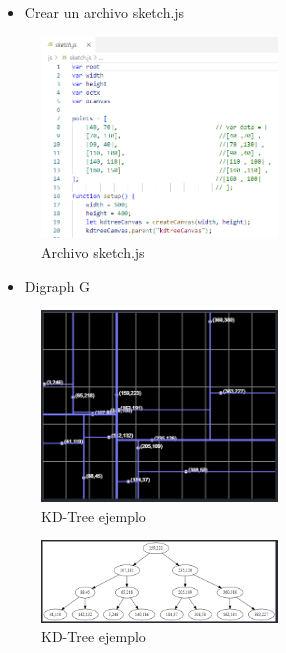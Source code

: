 \documentclass{article}
\begin{document}
\begin{enumerate}
\begin{itemize}
   \item Crear un archivo sketch.js
\end{itemize}

\begin{figure}[H]
\centering
\includegraphics[width=0.56\textwidth]{Img/sketch.js.png}
\caption{Archivo sketch.js}
\end{figure}

\begin{itemize}
   \item Digraph G
\end{itemize}

\begin{figure}[H]
\centering
\includegraphics[width=0.56\textwidth]{Img/KD-Tree_example_A.png}
\caption{KD-Tree ejemplo}
\end{figure}

\begin{figure}[H]
\centering
\includegraphics[width=0.56\textwidth]{Img/KD-Tree_example_B.png}
\caption{KD-Tree ejemplo}
\end{figure}


\end{enumerate}
\end{document}
